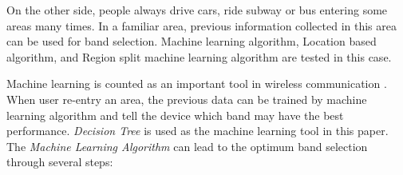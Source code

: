 %
On the other side, people always drive cars, ride subway or bus entering some areas many times. In a familiar area, previous information collected in this area can be used for band selection. 
Machine learning algorithm, Location based algorithm, and Region split machine learning algorithm are tested in this case.

Machine learning is counted as an important tool in wireless communication \cite{haykin2005cognitive}. When user re-entry an area, the previous data can be trained by machine learning algorithm and tell the device which band may have the best performance. \emph{Decision Tree} is used as the machine learning tool in this paper.
The \emph{Machine Learning Algorithm} can lead to the optimum band selection through several steps:

